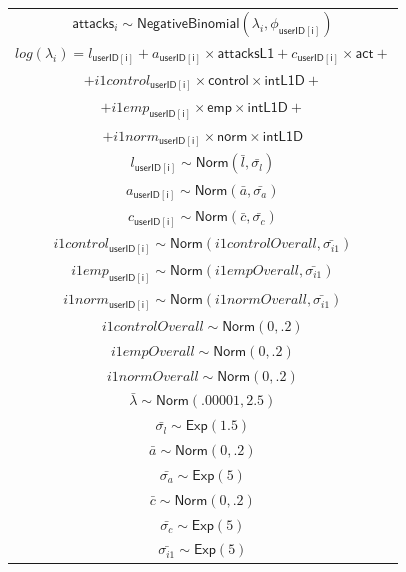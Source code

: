 \documentclass[preprint,12pt]{elsarticle}
\begin{document}
\footnotesize

\begin{center}
\begin{tabular}{c}
$\mathsf{attacks}_i  \sim  \mathsf{NegativeBinomial}(\lambda_i, \phi_{\mathsf{userID[i]}} ) $\\
$log(\lambda_i)  =  l_{\mathsf{userID[i]}} +
                  a_{\mathsf{userID[i]}} \times \mathsf{attacksL1} +
                  c_{\mathsf{userID[i]}} \times \mathsf{act} + $\\
$                   + 
       i1control_{\mathsf{userID[i]}} \times  \mathsf{control} \times \mathsf{intL1D}  +$ \\$         +  i1emp_{\mathsf{userID[i]}} \times  \mathsf{emp} \times \mathsf{intL1D}  +$ \\$
              +  i1norm_{\mathsf{userID[i]}} \times  \mathsf{norm} \times \mathsf{intL1D}
                          $\\ 
$  l_{\mathsf{userID[i]}}   \sim \textsf{Norm}(\bar{l}, \bar{\sigma_l}) $\\
$  a_{\mathsf{userID[i]}}  \sim \textsf{Norm}(\bar{a}, \bar{\sigma_a}) $\\
$  c_{\mathsf{userID[i]}}  \sim \textsf{Norm}(\bar{c}, \bar{\sigma_c}) $\\
 $ i1control_{\mathsf{userID[i]}}  \sim  \textsf{Norm}(i1controlOverall,\bar{\sigma_{i1}})$ \\
$   i1emp_{\mathsf{userID[i]}}  \sim  \textsf{Norm}(i1empOverall, \bar{\sigma_{i1}})$\\  
 $ i1norm_{\mathsf{userID[i]}}   \sim  
     \textsf{Norm}(i1normOverall, \bar{\sigma_{i1}})$\\
$     i1controlOverall  \sim  \textsf{Norm}(0,.2)$\\
$    i1empOverall   \sim  \textsf{Norm}(0,.2) $\\
$    i1normOverall   \sim  \textsf{Norm}(0,.2) $\\
$    \bar{\lambda}   \sim  \textsf{Norm}(.00001, 2.5) $\\
$    \bar{\sigma_l}  \sim  \mathsf{Exp}(1.5)$\\
$    \bar{a}  \sim \textsf{Norm}(0, .2) $\\
$    \bar{\sigma_a}  \sim  \mathsf{Exp}(5) $\\
$    \bar{c}  \sim  \mathsf{Norm}(0, .2)$\\
$    \bar{\sigma_c}  \sim \mathsf{Exp}(5) $\\
$    \bar{\sigma_{i1}}  \sim  \mathsf{Exp}(5)
$\end{tabular}
\end{center}
\end{document}
